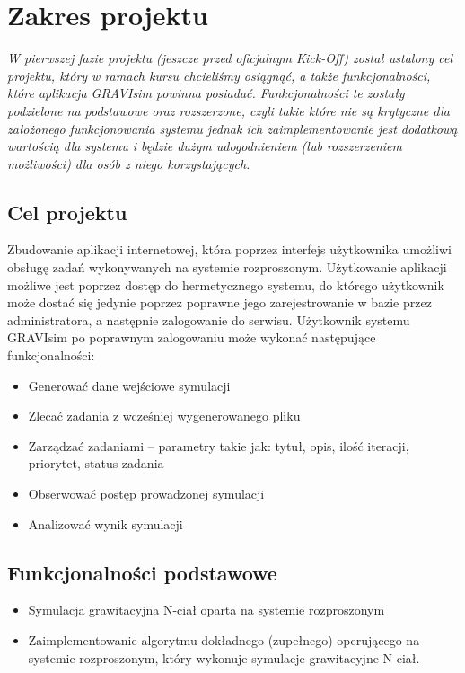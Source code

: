 \documentclass[a4paper,onecolumn,oneside,12pt]{memoir}
\begin{document}
\chapter{Zakres projektu}
{\emph{\quad \quad W pierwszej fazie projektu (jeszcze przed oficjalnym Kick-Off) został ustalony cel projektu, który w ramach kursu chcieliśmy osiągnąć, a także funkcjonalności, które aplikacja GRAVIsim powinna posiadać. Funkcjonalności te zostały podzielone na podstawowe oraz rozszerzone, czyli takie które nie są krytyczne dla założonego funkcjonowania systemu jednak ich zaimplementowanie jest dodatkową wartością dla systemu i będzie dużym udogodnieniem (lub rozszerzeniem możliwości) dla osób z niego korzystających.}


\section{Cel projektu}

\quad \quad Zbudowanie aplikacji internetowej, która poprzez interfejs użytkownika umożliwi obsługę zadań wykonywanych na systemie rozproszonym. 
Użytkowanie aplikacji możliwe jest poprzez dostęp do hermetycznego systemu, do którego użytkownik może dostać się jedynie poprzez poprawne jego zarejestrowanie w bazie przez administratora, a następnie zalogowanie do serwisu. 
Użytkownik systemu GRAVIsim po poprawnym zalogowaniu może wykonać następujące funkcjonalności:
\begin{itemize}
\item Generować dane wejściowe symulacji
\item Zlecać zadania z wcześniej wygenerowanego pliku
\item Zarządzać zadaniami – parametry takie jak: tytuł, opis, ilość iteracji, priorytet, status zadania
\item Obserwować postęp prowadzonej symulacji
\item Analizować wynik symulacji

\end{itemize}

\section{Funkcjonalności podstawowe}

\begin{itemize}\bfseries
\item Symulacja grawitacyjna N-ciał oparta na systemie rozproszonym
\end{itemize}
\begin{itemize}
\item[] Zaimplementowanie algorytmu dokładnego (zupełnego) operującego na systemie rozproszonym, który wykonuje symulacje grawitacyjne N-ciał. 
\end{itemize}
\pagebreak

}
\end{document}
